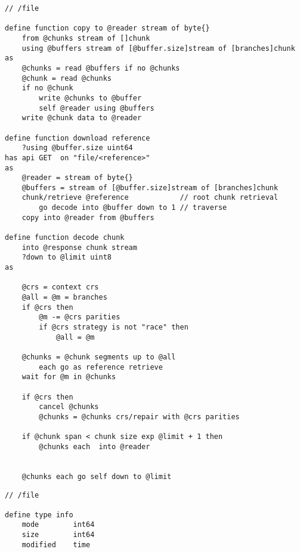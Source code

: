 \begin{definition}\label{def:file-retrieval}
\begin{lstlisting}[language=buzz1]
// /file

define function copy to @reader stream of byte{}
    from @chunks stream of []chunk
    using @buffers stream of [@buffer.size]stream of [branches]chunk
as
    @chunks = read @buffers if no @chunks
    @chunk = read @chunks
    if no @chunk
        write @chunks to @buffer
        self @reader using @buffers
    write @chunk data to @reader

define function download reference
    ?using @buffer.size uint64
has api GET  on "file/<reference>" 
as
    @reader = stream of byte{} 
    @buffers = stream of [@buffer.size]stream of [branches]chunk
    chunk/retrieve @reference            // root chunk retrieval
        go decode into @buffer down to 1 // traverse          
    copy into @reader from @buffers 

define function decode chunk 
    into @response chunk stream
    ?down to @limit uint8
as
     
    @crs = context crs
    @all = @m = branches 
    if @crs then
        @m -= @crs parities
        if @crs strategy is not "race" then 
            @all = @m 
        
    @chunks = @chunk segments up to @all 
        each go as reference retrieve 
    wait for @m in @chunks 
    
    if @crs then 
        cancel @chunks
        @chunks = @chunks crs/repair with @crs parities 
    
    if @chunk span < chunk size exp @limit + 1 then
        @chunks each  into @reader
        
       
    @chunks each go self down to @limit  

\end{lstlisting}
\end{definition}


\begin{definition}\label{def:file-info}
\begin{lstlisting}[language=buzz1]
// /file

define type info
    mode        int64 
    size        int64
    modified    time        

\end{lstlisting}
\end{definition}

